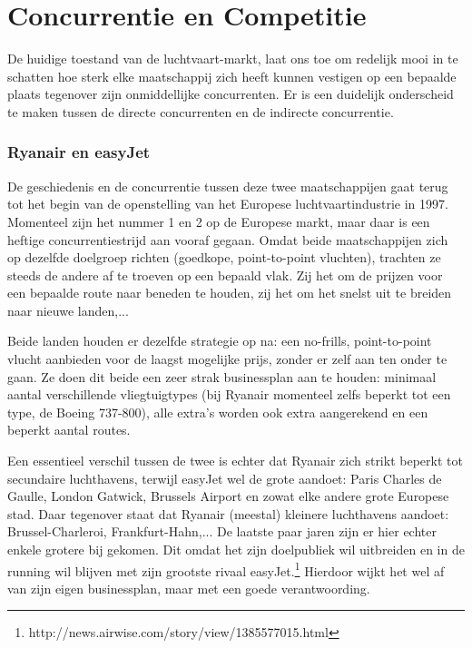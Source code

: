 \documentclass{article}
\begin{document}
\newpage
\part{Concurrentie en Competitie}

De huidige toestand van de luchtvaart-markt, laat ons toe om redelijk mooi in te schatten hoe sterk elke maatschappij zich heeft kunnen vestigen op een bepaalde plaats tegenover zijn onmiddellijke concurrenten.
Er is een duidelijk onderscheid te maken tussen de directe concurrenten en de indirecte concurrentie.

\section{Ryanair en easyJet}

De geschiedenis en de concurrentie tussen deze twee maatschappijen gaat terug tot het begin van de openstelling van het Europese luchtvaartindustrie in 1997. Momenteel zijn het nummer 1 en 2 op de Europese markt, maar daar is een heftige concurrentiestrijd aan vooraf gegaan. Omdat beide maatschappijen zich op dezelfde doelgroep richten (goedkope, point-to-point vluchten), trachten ze steeds de andere af te troeven op een bepaald vlak. Zij het om de prijzen voor een bepaalde route naar beneden te houden, zij het om het snelst uit te breiden naar nieuwe landen,...

Beide landen houden er dezelfde strategie op na: een no-frills, point-to-point vlucht aanbieden voor de laagst mogelijke prijs, zonder er zelf aan ten onder te gaan. Ze doen dit beide een zeer strak businessplan aan te houden: minimaal aantal verschillende vliegtuigtypes (bij Ryanair momenteel zelfs beperkt tot een type, de Boeing 737-800), alle extra's worden ook extra aangerekend en een beperkt aantal routes.

Een essentieel verschil tussen de twee is echter dat Ryanair zich strikt beperkt tot secundaire luchthavens, terwijl easyJet wel de grote aandoet: Paris Charles de Gaulle, London Gatwick, Brussels Airport en zowat elke andere grote Europese stad. Daar tegenover staat dat Ryanair (meestal) kleinere luchthavens aandoet: Brussel-Charleroi, Frankfurt-Hahn,... De laatste paar jaren zijn er hier echter enkele grotere bij gekomen. Dit omdat het zijn doelpubliek wil uitbreiden en in de running wil blijven met zijn grootste rivaal easyJet.\footnote{http://news.airwise.com/story/view/1385577015.html} Hierdoor wijkt het wel af van zijn eigen businessplan, maar met een goede verantwoording.
\end{document}
